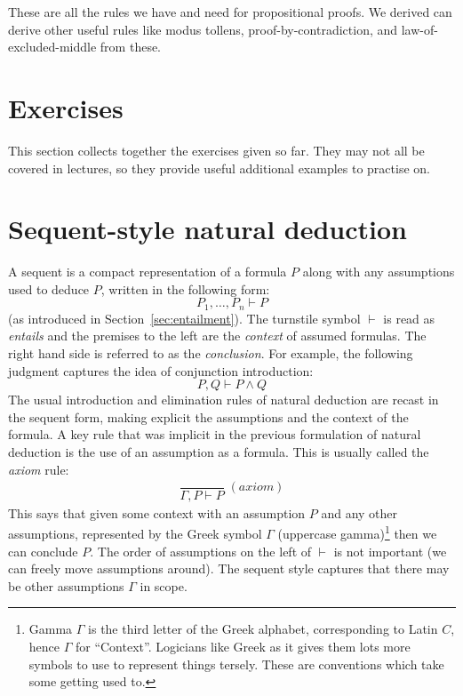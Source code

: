 \documentclass{article}
\theoremstyle{definition}
\begin{document}
\vspace{3em}

\noindent
These are all the rules we have and need for propositional proofs. We
derived can derive other useful rules like modus tollens,
proof-by-contradiction, and law-of-excluded-middle from these.

\newpage

\section{Exercises}

  This section collects together the exercises given so far. They may
  not all be covered in lectures, so they provide useful
  additional examples to practise on.

  \assoc*
  \andReproof*
  \implProperty*
  \kcombinator*
  \biimplRules*
  \orassoc*
  \disproveEx*
  \lemp*

\appendix

\section{Sequent-style natural deduction}
\label{app:sequent}

A sequent is a compact representation of a formula $P$ along with
any assumptions used to deduce $P$, written in the following form:
%
\begin{equation*}
P_1, \ldots, P_n \vdash P
\end{equation*}
%
(as introduced in Section~\ref{sec:entailment}). The turnstile symbol
$\vdash$ is read as \emph{entails} and the premises to the left are
the \emph{context} of assumed formulas. The right hand side is
referred to as the \emph{conclusion}.  For example, the following
judgment captures the idea of conjunction introduction:
%
\begin{equation*}
P, Q \vdash P \wedge Q
\end{equation*}
%
The usual introduction and elimination rules of natural deduction are
recast in the sequent form, making explicit the assumptions
and the context of the formula. A key rule that was implicit in the
previous formulation of natural deduction is the use of an assumption
as a formula. This is usually called the \emph{axiom} rule:
%
\begin{align*}
\dfrac{\qquad}{\Gamma, P \vdash P} \; (\textit{axiom})
\end{align*}
%
This says that given some context with an assumption $P$ and any other
assumptions, represented by the Greek symbol $\Gamma$ (uppercase
gamma)\footnote{Gamma $\Gamma$ is the third letter of the Greek
  alphabet, corresponding to Latin $C$, hence $\Gamma$ for
  ``Context''. Logicians like Greek as it gives them lots more symbols
  to use to represent things tersely. These are conventions which take
  some getting used to.} then we can conclude $P$.  The order of
assumptions on the left of $\vdash$ is not important (we can freely
move assumptions around).  The sequent style captures that there may
be other assumptions $\Gamma$ in scope.
\end{document}
